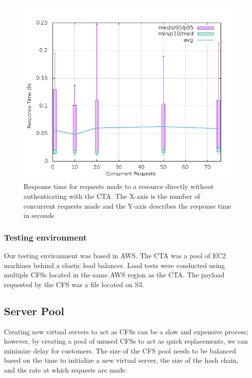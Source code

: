 \documentclass[a4paper,twoside]{article}
\begin{document}
\begin{figure}[h]
\includegraphics[width=\columnwidth]{direct_20s}
\caption{Response time for requests made to a resource directly without authenticating with the CTA. The X-axis is the number of concurrent requests made and the Y-axis describes the response time in seconds}
\label{fig:direct_20s}
\end{figure}

\subsubsection{Testing environment}

Our testing environment was based in AWS. The CTA was a pool of EC2 machines behind a elastic load balancer. Load tests were conducted using multiple CFSs located in the same AWS region as the CTA. The payload requested by the CFS was a file located on S3.

\subsection{Server Pool}

Creating new virtual servers to act as CFSs can be a slow and expensive process; however, by creating a pool of unused CFSs to act as quick replacements, we can minimize delay for customers. The size of the CFS pool needs to be balanced based on the time to initialize a new virtual server, the size of the hash chain, and the rate at which requests are made.
\end{document}
